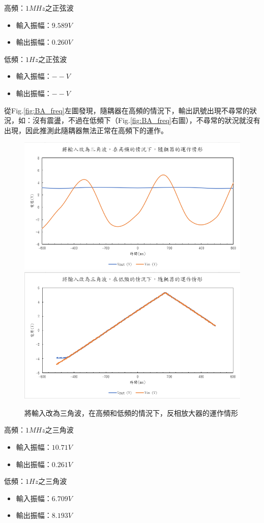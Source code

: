 \documentclass[12pt,a4paper]{article}
\begin{document}
\begin{CJK}{UTF8}{bkai}
\begin{enumerate}
高頻：$1MHz$之正弦波
\begin{itemize}
    \item 輸入振幅：$9.589V$
    \item 輸出振幅：$0.260V$
\end{itemize}

低頻：$1Hz$之正弦波
\begin{itemize}
    \item 輸入振幅：$--V$
    \item 輸出振幅：$--V$
\end{itemize}


\noindent
從Fig.\ref{fig:BA_freq}左圖發現，隨耦器在高頻的情況下，輸出訊號出現不尋常的狀況，如：沒有震盪，不過在低頻下（Fig.\ref{fig:BA_freq}右圖），不尋常的狀況就沒有出現，因此推測此隨耦器無法正常在高頻下的運作。


\begin{figure}[h]
    \centering
    \includegraphics[width=0.45\linewidth]{figures/Buffer amplifier/Buffer amplifier_tri_high freq.png}
    \includegraphics[width=0.45\linewidth]{figures/Buffer amplifier/Buffer amplifier_tri_low freq.png}
    \caption{將輸入改為三角波，在高頻和低頻的情況下，反相放大器的運作情形}
    \label{fig:BA_tri_freq}
\end{figure}

高頻：$1MHz$之三角波
\begin{itemize}
    \item 輸入振幅：$10.71V$
    \item 輸出振幅：$0.261V$
\end{itemize}

低頻：$1Hz$之三角波
\begin{itemize}
    \item 輸入振幅：$6.709V$
    \item 輸出振幅：$8.193V$
\end{itemize}


\end{enumerate}
\end{CJK}
\end{document}
